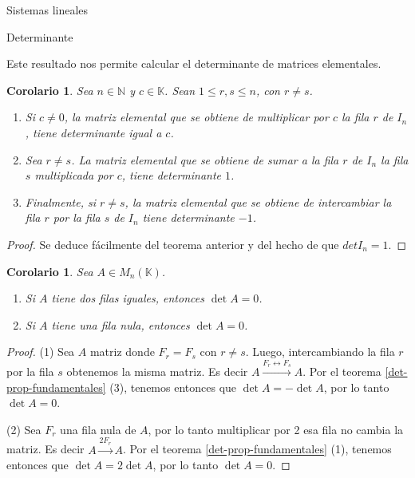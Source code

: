 \documentclass[a4paper,12pt,twoside,spanish]{amsbook}
\newtheorem{corolario}[teorema]{Corolario}
\theoremstyle{definition}
\theoremstyle{remark}
\newcommand{\K}{\mathbb K}
\begin{document}
\begin{chapter}{Sistemas lineales}
\begin{section}{Determinante}
	
	
	Este resultado nos permite calcular el determinante de matrices elementales.
	
	
	
	
	\begin{corolario}\label{det-mtrx-elem} Sea $n \in \mathbb N$ y $c \in \K$. Sean $1 \le r,s \le n$,  con $r \ne s$.
		\begin{enumerate}
			\item Si $c \not=0$, la matriz elemental que se obtiene de multiplicar por  $c$ la fila $r$ de $I_n$, tiene determinante igual a $c$.
			\item Sea $r \ne s$. La matriz elemental que se obtiene de sumar a la fila $r$ de $I_n$  la fila $s$ multiplicada por $c$, tiene determinante $1$.
			\item Finalmente, si $r \ne s$, la matriz elemental que se obtiene de intercambiar la fila $r$ por la fila $s$ de $I_n$ tiene determinante $-1$.
		\end{enumerate}	
	\end{corolario} 
	\begin{proof}
		Se deduce fácilmente del teorema anterior y del hecho de que $det I_n =1$.			
	\end{proof}
	
	
	\begin{corolario}\label{det-filas-iguales} Sea $A  \in M_n(\K)$.
		\begin{enumerate}
			\item Si $A$ tiene dos filas iguales,  entonces $\det A=0$.
			\item Si $A$ tiene una fila nula, entonces $\det A =0$.
		\end{enumerate}
	\end{corolario}
	\begin{proof}
		(1) Sea $A$ matriz donde $F_r = F_s$ con $r\ne s$. Luego, intercambiando la fila $r$ por la fila $s$ obtenemos la misma matriz. Es decir $A  \stackrel{F_r \leftrightarrow F_s}{\longrightarrow} A$. Por el teorema \ref{det-prop-fundamentales} (3), tenemos entonces que $\det A = - \det A$, por lo tanto  $\det A =0$. 
		
		(2) Sea $F_r$ una fila nula de $A$, por lo tanto multiplicar por 2 esa fila no cambia la matriz. Es decir $A  \stackrel{2F_r}{\longrightarrow} A$. Por el teorema \ref{det-prop-fundamentales} (1), tenemos entonces que $\det A = 2\det A$, por lo tanto  $\det A =0$.
	\end{proof}
	
	
	

\end{section}
\end{chapter}
\end{document}
